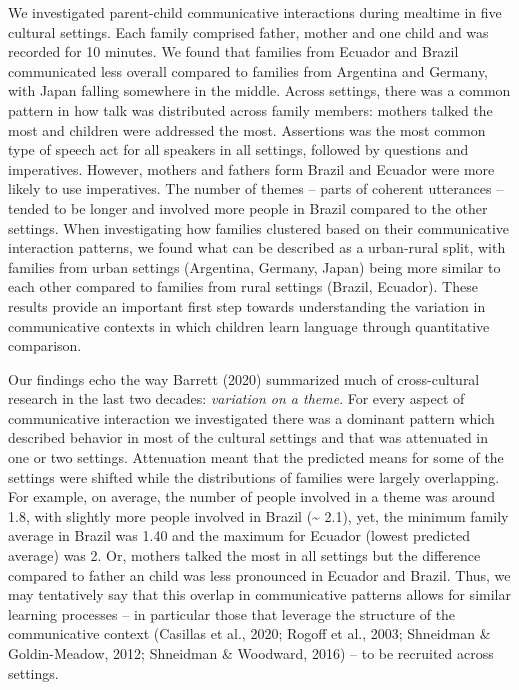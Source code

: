 \documentclass[
  man,floatsintext]{apa6}
\begin{document}
We investigated parent-child communicative interactions during mealtime in five cultural settings. Each family comprised father, mother and one child and was recorded for 10 minutes. We found that families from Ecuador and Brazil communicated less overall compared to families from Argentina and Germany, with Japan falling somewhere in the middle. Across settings, there was a common pattern in how talk was distributed across family members: mothers talked the most and children were addressed the most. Assertions was the most common type of speech act for all speakers in all settings, followed by questions and imperatives. However, mothers and fathers form Brazil and Ecuador were more likely to use imperatives. The number of themes -- parts of coherent utterances -- tended to be longer and involved more people in Brazil compared to the other settings. When investigating how families clustered based on their communicative interaction patterns, we found what can be described as a urban-rural split, with families from urban settings (Argentina, Germany, Japan) being more similar to each other compared to families from rural settings (Brazil, Ecuador). These results provide an important first step towards understanding the variation in communicative contexts in which children learn language through quantitative comparison.

Our findings echo the way Barrett (2020) summarized much of cross-cultural research in the last two decades: \emph{variation on a theme}. For every aspect of communicative interaction we investigated there was a dominant pattern which described behavior in most of the cultural settings and that was attenuated in one or two settings. Attenuation meant that the predicted means for some of the settings were shifted while the distributions of families were largely overlapping. For example, on average, the number of people involved in a theme was around 1.8, with slightly more people involved in Brazil (\textasciitilde{} 2.1), yet, the minimum family average in Brazil was 1.40 and the maximum for Ecuador (lowest predicted average) was 2. Or, mothers talked the most in all settings but the difference compared to father an child was less pronounced in Ecuador and Brazil. Thus, we may tentatively say that this overlap in communicative patterns allows for similar learning processes -- in particular those that leverage the structure of the communicative context (Casillas et al., 2020; Rogoff et al., 2003; Shneidman \& Goldin-Meadow, 2012; Shneidman \& Woodward, 2016) -- to be recruited across settings.
\end{document}
